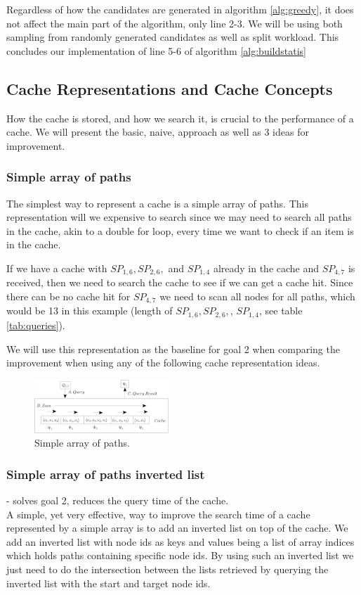Regardless of how the candidates are generated in algorithm \ref{alg:greedy}, it does not affect the main part of the algorithm, only line 2-3. We will be using both sampling from randomly generated candidates as well as split workload. This concludes our implementation of line 5-6 of algorithm \ref{alg:buildstatis}


\subsection{Cache Representations and Cache Concepts} \label{subsec:cacherepresentatons}
How the cache is stored, and how we search it, is crucial to the performance of a cache. We will present the basic, naive, approach as well as 3 ideas for improvement.
% 
\subsubsection{Simple array of paths}%
The simplest way to represent a cache is a simple array of paths. This representation will we expensive to search since we may need to search all paths in the cache, akin to a double for loop, every time we want to check if an item is in the cache.

If we have a cache with $SP_{1,6},SP_{2,6},$ and $SP_{1,4}$ already in the cache and $SP_{4,7}$ is received, then we need to search the cache to see if we can get a cache hit. Since there can be no cache hit for $SP_{4,7}$ we need to scan all nodes for all paths, which would be 13 in this example (length of $SP_{1,6},SP_{2,6},$, $SP_{1,4}$, see table \ref{tab:queries}).

We will use this representation as the baseline for goal 2 when comparing the improvement when using any of the following cache representation ideas.

\begin{figure}[hbt]
  \center
        \includegraphics[width=0.45\textwidth]{figures/cachearray.pdf}
        \caption{Simple array of paths.}
  \label{fig:cachearray}
\end{figure}


\subsubsection{Simple array of paths inverted list} - solves goal 2, reduces the query time of the cache.\\
A simple, yet very effective, way to improve the search time of a cache represented by a simple array is to add an inverted list on top of the cache. We add an inverted list with node ids as keys and values being a list of array indices which holds paths containing specific node ids. By using such an inverted list we just need to do the intersection between the lists retrieved by querying the inverted list with the start and target node ids. 

